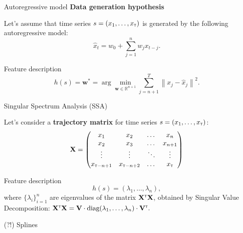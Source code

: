 \documentclass{beamer}
\newcommand{\T}{{\text{\tiny\sffamily\upshape\mdseries T}}}
\begin{document}
\begin{frame}{Autoregressive model}
	\textbf{Data generation hypothesis}
	
		Let's assume that time series $s = (x_1, \dots, x_\T)$ is generated by the following autoregressive model:
		\[
			\widehat{x}_t = w_0 + \sum_{j=1}^n w_j x_{t-j}.
		\]
	\vfill
	\begin{block}{Feature description}
		\[
			h(s) = \mathbf{w}^* = \arg \min_{\mathbf{w} \in \mathbb{R}^{n+1}} \sum_{j=n+1}^{T} \left\| x_j - \hat{x}_j \right\|^2.
		\]
	\end{block}
\end{frame}
\begin{frame}{Singular Spectrum Analysis (SSA)}
	
	Let's consider a \textbf{trajectory matrix} for time series $s = (x_1, \dots, x_\T)$:
	\[
		\mathbf{X} = 
		\begin{pmatrix}
			x_1 & x_2 & \dots & x_n \\
			x_2 & x_3 & \dots & x_{n+1} \\
			\vdots & \vdots & \ddots & \vdots\\
			x_{\T-n+1} & x_{\T-n+2} & \dots & x_{\T}
		\end{pmatrix}
	\]
	\vfill
	\begin{block}{Feature description}
		\[
			h(s) = \left(\lambda_1, \dots ,\lambda_n\right),
		\]
		where $\{\lambda_i\}_{i=1}^n$ are eigenvalues of the matrix $\mathbf{X}^{\T} \mathbf{X}$, obtained by Singular Value Decomposition:
		$
			\mathbf{X}^{\T} \mathbf{X} = \mathbf{V} \cdot \text{diag} (\lambda_1, \dots, \lambda_n) \cdot \mathbf{V}^{\T}.
		$
	\end{block}

\end{frame}
\begin{frame}{(?!) Splines}
	
\end{frame}
\end{document}
